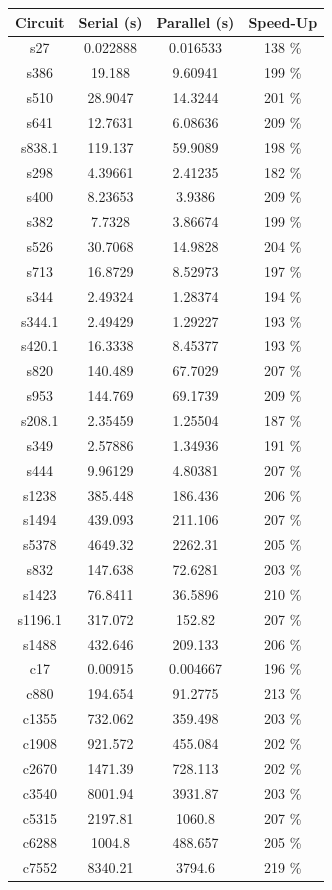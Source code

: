 \documentclass[a4paper,12pt]{article}
\begin{document}
\begin{center}
\begin{tabular}{||c c c c||}
\hline
Circuit & Serial (s) & Parallel (s) & Speed-Up \\ [0.5ex] 
\hline\hline
s27 & 0.022888 & 0.016533 & 138 \% \\ 
\hline
s386 & 19.188 & 9.60941 & 199 \% \\ 
\hline
s510 & 28.9047 & 14.3244 & 201 \% \\ 
\hline
s641 & 12.7631 & 6.08636 & 209 \% \\ 
\hline
s838.1 & 119.137 & 59.9089 & 198 \% \\ 
\hline
s298 & 4.39661 & 2.41235 & 182 \% \\ 
\hline
s400 & 8.23653 & 3.9386 & 209 \% \\ 
\hline
s382 & 7.7328 & 3.86674 & 199 \% \\ 
\hline
s526 & 30.7068 & 14.9828 & 204 \% \\ 
\hline
s713 & 16.8729 & 8.52973 & 197 \% \\ 
\hline
s344 & 2.49324 & 1.28374 & 194 \% \\ 
\hline
s344.1 & 2.49429 & 1.29227 & 193 \% \\ 
\hline
s420.1 & 16.3338 & 8.45377 & 193 \% \\ 
\hline
s820 & 140.489 & 67.7029 & 207 \% \\ 
\hline
s953 & 144.769 & 69.1739 & 209 \% \\ 
\hline
s208.1 & 2.35459 & 1.25504 & 187 \% \\ 
\hline
s349 & 2.57886 & 1.34936 & 191 \% \\ 
\hline
s444 & 9.96129 & 4.80381 & 207 \% \\ 
\hline
s1238 & 385.448 & 186.436 & 206 \% \\ 
\hline
s1494 & 439.093 & 211.106 & 207 \% \\ 
\hline
s5378 & 4649.32 & 2262.31 & 205 \% \\ 
\hline
s832 & 147.638 & 72.6281 & 203 \% \\ 
\hline
s1423 & 76.8411 & 36.5896 & 210 \% \\ 
\hline
s1196.1 & 317.072 & 152.82 & 207 \% \\ 
\hline
s1488 & 432.646 & 209.133 & 206 \% \\ 
\hline
c17 & 0.00915 & 0.004667 & 196 \% \\ 
\hline
c880 & 194.654 & 91.2775 & 213 \% \\ 
\hline
c1355 & 732.062 & 359.498 & 203 \% \\ 
\hline
c1908 & 921.572 & 455.084 & 202 \% \\ 
\hline
c2670 & 1471.39 & 728.113 & 202 \% \\ 
\hline
c3540 & 8001.94 & 3931.87 & 203 \% \\ 
\hline
c5315 & 2197.81 & 1060.8 & 207 \% \\ 
\hline
c6288 & 1004.8 & 488.657 & 205 \% \\ 
\hline
c7552 & 8340.21 & 3794.6 & 219 \% \\ 
\hline






\end{tabular}
\end{center}
\end{document}
